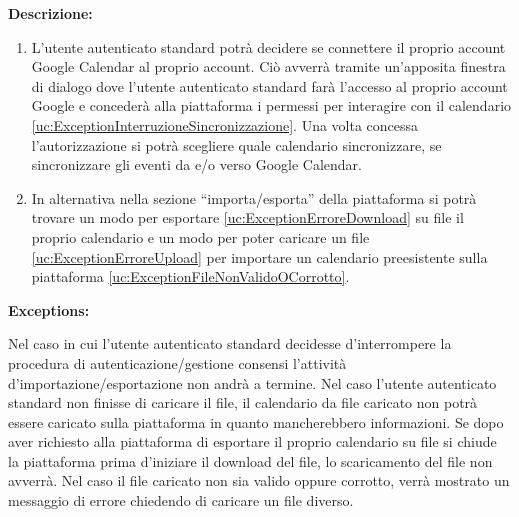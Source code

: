 \begin{listaPersonale}[UC]{}
    \textbf{Descrizione:}
    \begin{enumerate}
        \item L'utente autenticato standard potrà decidere se connettere il proprio account Google Calendar al proprio account. Ciò avverrà tramite un'apposita finestra di dialogo dove l'utente autenticato standard farà l'accesso al proprio account Google e concederà alla piattaforma i permessi per interagire con il calendario \ref{uc:ExceptionInterruzioneSincronizzazione}. Una volta concessa l'autorizzazione si potrà scegliere quale calendario sincronizzare, se sincronizzare gli eventi da e/o verso Google Calendar.
        \item In alternativa nella sezione “importa/esporta” della piattaforma si potrà trovare un modo per esportare \ref{uc:ExceptionErroreDownload} su file il proprio calendario e un modo per poter caricare un file \ref{uc:ExceptionErroreUpload} per importare un calendario preesistente sulla piattaforma \ref{uc:ExceptionFileNonValidoOCorrotto}.
    \end{enumerate}

    \textbf{Exceptions:}
    \begin{enumerate}[label=\textbf{[exception \arabic{enumii}]}, ref= \textbf{[exception \arabic{enumii}]}]
         Nel caso in cui l'utente autenticato standard decidesse d'interrompere la procedura di autenticazione/gestione consensi l'attività d'importazione/esportazione non andrà a termine.
         Nel caso l'utente autenticato standard non finisse di caricare il file, il calendario da file caricato non potrà essere caricato sulla piattaforma in quanto mancherebbero informazioni.
         Se dopo aver richiesto alla piattaforma di esportare il proprio calendario su file si chiude la piattaforma prima d'iniziare il download del file, lo scaricamento del file non avverrà.
         Nel caso il file caricato non sia valido oppure corrotto, verrà mostrato un messaggio di errore chiedendo di caricare un file diverso.
    \end{enumerate}


\end{listaPersonale}